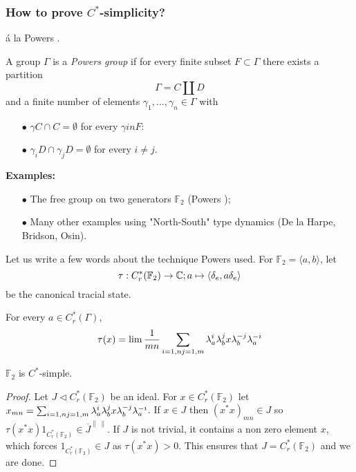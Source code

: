 \subsubsection{How to prove $C^*$-simplicity?}

\'a la Powers \cite{Powers1975simplicity}.

\begin{definition}
A group $\Gamma$ is a \textit{Powers group} if for every finite subset $F\subset \Gamma$ there exists a partition
\[\Gamma = C \coprod D \]
and a finite number of elements $\gamma_1,...,\gamma_n\in \Gamma$ with 
\begin{itemize}
\item[$\bullet$] $\gamma C \cap C = \emptyset$ for every $\gamma in F$:
\item[$\bullet$] $\gamma_i D \cap \gamma_j D = \emptyset$ for every $i\neq j$.
\end{itemize}
\end{definition}  

\textbf{Examples:}
\begin{itemize}
\item[$\bullet$] The free group on two generators $\mathbb F_2$ (Powers \cite{Powers1975simplicity});
\item[$\bullet$] Many other examples using "North-South" type dynamics (De la Harpe, Bridson, Osin).
\end{itemize}

Let us write a few words about the technique Powers used. For $\mathbb F_2 = \langle a,b\rangle$, let 
\[\tau : C^*_r(\mathbb F_2) \rightarrow \mathbb C ; a \mapsto \langle \delta_e , a \delta_e \rangle\]
be the canonical tracial state. 

\begin{thm}
For every $a\in C_r^*(\Gamma)$, 
\[\tau(x) = \lim \frac{1}{mn} \sum_{i=1,n \\ j= 1,m} \lambda_a^i \lambda_b^j x \lambda_b^{-j} \lambda_a^{-i}\]
\end{thm}

\begin{cor}
$\mathbb F_2$ is $C^*$-simple.
\end{cor}

\begin{proof}
Let $J \vartriangleleft C_r^*(\mathbb F_2)$ be an ideal. For $x\in C_r^*(\mathbb F_2) $ let $x_{mn}=\sum_{i=1,n \\ j= 1,m} \lambda_a^i \lambda_b^j x \lambda_b^{-j} \lambda_a^{-i} $. If $x\in J$ then $(x^* x )_{mn}\in J$ so $\tau(x^*x)1_{C_r^*(\mathbb F_2)} \in \overline{J}^{\| \ \|} $. If $J$ is not trivial, it contains a non zero element $x$, which forces $1_{C_r^*(\mathbb F_2)} \in J$ as $\tau(x^* x)>0$. This ensures that $J = C^*_r(\mathbb F_2)$ and we are done. 
\end{proof}

